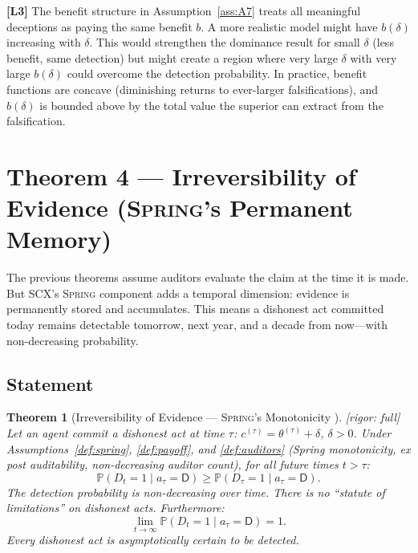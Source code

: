 \documentclass[11pt,a4paper]{article}
\newtheorem{theorem}{Theorem}[section]
\theoremstyle{definition}
\theoremstyle{remark}
\newcommand{\rigorFull}{\textcolor{green!60!black}{[rigor: full]}}
\newcommand{\limitationTag}[1]{\textsf{\textbf{[L#1]}}}
\newcommand{\SCX}{\textsc{SCX}}
\newcommand{\Spring}{\textsc{Spring}}
\newcommand{\Pbb}{\mathbb{P}}
\newcommand{\dishonest}{\mathsf{D}}
\newcommand{\claim}{c}
\newcommand{\truth}{\theta}
\newcommand{\deception}{\delta}
\newcommand{\benefit}{b}
\begin{document}
\limitationTag{3} The benefit structure in Assumption~\ref{ass:A7} treats all meaningful deceptions as paying the same benefit $b$. A more realistic model might have $\benefit(\deception)$ increasing with $\deception$. This would strengthen the dominance result for small $\deception$ (less benefit, same detection) but might create a region where very large $\deception$ with very large $\benefit(\deception)$ could overcome the detection probability. In practice, benefit functions are concave (diminishing returns to ever-larger falsifications), and $\benefit(\deception)$ is bounded above by the total value the superior can extract from the falsification.

\section{Theorem 4 --- Irreversibility of Evidence (\Spring{}'s Permanent Memory) }
\label{sec:thm4}

The previous theorems assume auditors evaluate the claim at the time it is made. But \SCX{}'s \Spring{} component adds a temporal dimension: evidence is permanently stored and accumulates. This means a dishonest act committed today remains detectable tomorrow, next year, and a decade from now---with non-decreasing probability.

\subsection{Statement}

\begin{theorem}[Irreversibility of Evidence --- \Spring{}'s Monotonicity ]
\label{thm:irreversibility}
\rigorFull
Let an agent commit a dishonest act at time $\tau$: $\claim^{(\tau)} = \truth^{(\tau)} + \deception$, $\deception > 0$. Under Assumptions~\ref{def:spring}, \ref{def:payoff}, and \ref{def:auditors} (Spring monotonicity, ex post auditability, non-decreasing auditor count), for all future times $t > \tau$:
\begin{equation}
    \Pbb(D_t = 1 \mid a_\tau = \dishonest) \geq \Pbb(D_\tau = 1 \mid a_\tau = \dishonest).
    \label{eq:irreversibility}
\end{equation}
The detection probability is non-decreasing over time. There is no ``statute of limitations'' on dishonest acts. Furthermore:
\begin{equation}
    \lim_{t \to \infty} \Pbb(D_t = 1 \mid a_\tau = \dishonest) = 1.
    \label{eq:irreversibility_limit}
\end{equation}
Every dishonest act is asymptotically certain to be detected.
\end{theorem}
\end{document}
